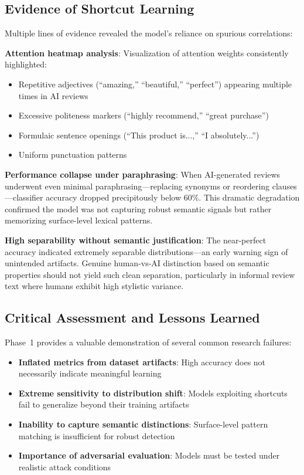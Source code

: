 \documentclass[conference]{IEEEtran}
\begin{document}
\subsection{Evidence of Shortcut Learning}

Multiple lines of evidence revealed the model's reliance on spurious correlations:

\textbf{Attention heatmap analysis}: Visualization of attention weights consistently highlighted:
\begin{itemize}
    \item Repetitive adjectives (``amazing,'' ``beautiful,'' ``perfect'') appearing multiple times in AI reviews
    \item Excessive politeness markers (``highly recommend,'' ``great purchase'')
    \item Formulaic sentence openings (``This product is...,'' ``I absolutely...'')
    \item Uniform punctuation patterns
\end{itemize}

\textbf{Performance collapse under paraphrasing}: When AI-generated reviews underwent even minimal paraphrasing—replacing synonyms or reordering clauses—classifier accuracy dropped precipitously below 60\%. This dramatic degradation confirmed the model was not capturing robust semantic signals but rather memorizing surface-level lexical patterns.

\textbf{High separability without semantic justification}: The near-perfect accuracy indicated extremely separable distributions—an early warning sign of unintended artifacts. Genuine human-vs-AI distinction based on semantic properties should not yield such clean separation, particularly in informal review text where humans exhibit high stylistic variance.

\subsection{Critical Assessment and Lessons Learned}

Phase~1 provides a valuable demonstration of several common research failures:

\begin{itemize}
    \item \textbf{Inflated metrics from dataset artifacts}: High accuracy does not necessarily indicate meaningful learning
    \item \textbf{Extreme sensitivity to distribution shift}: Models exploiting shortcuts fail to generalize beyond their training artifacts
    \item \textbf{Inability to capture semantic distinctions}: Surface-level pattern matching is insufficient for robust detection
    \item \textbf{Importance of adversarial evaluation}: Models must be tested under realistic attack conditions
\end{itemize}
\end{document}
